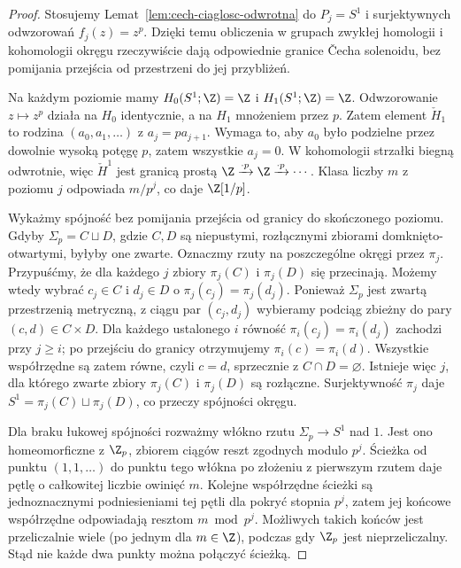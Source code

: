 \begin{proof}
Stosujemy Lemat~\ref{lem:cech-ciaglosc-odwrotna} do
$P_j=S^1$ i surjektywnych odwzorowań
$f_j(z)=z^p$. Dzięki temu obliczenia
w grupach zwykłej homologii i kohomologii
okręgu rzeczywiście dają odpowiednie granice
\v{C}echa solenoidu, bez pomijania przejścia
od przestrzeni do jej przybliżeń.

Na każdym poziomie mamy $H_0(S^1;\Z)=\Z$ i
$H_1(S^1;\Z)=\Z$. Odwzorowanie $z\mapsto z^p$ działa
na $H_0$ identycznie, a na $H_1$ mnożeniem przez $p$.
Zatem element $\check H_1$ to rodzina
$(a_0,a_1,\ldots)$ z $a_j=pa_{j+1}$.
Wymaga to, aby $a_0$ było podzielne przez dowolnie
wysoką potęgę $p$, zatem wszystkie $a_j=0$.
W kohomologii strzałki biegną odwrotnie, więc
$\check H^1$ jest granicą prostą
$\Z\xrightarrow{\cdot p}\Z\xrightarrow{\cdot p}\cdots$.
Klasa liczby $m$ z poziomu $j$ odpowiada $m/p^j$,
co daje $\Z[1/p]$.

Wykażmy spójność bez pomijania przejścia od granicy do
skończonego poziomu. Gdyby
$\Sigma_p=C\sqcup D$, gdzie $C,D$ są niepustymi,
rozłącznymi zbiorami domknięto-otwartymi, byłyby one zwarte.
Oznaczmy rzuty na poszczególne okręgi przez $\pi_j$.
Przypuśćmy, że dla każdego $j$ zbiory
$\pi_j(C)$ i $\pi_j(D)$ się przecinają.
Możemy wtedy wybrać $c_j\in C$ i $d_j\in D$ o
$\pi_j(c_j)=\pi_j(d_j)$. Ponieważ $\Sigma_p$ jest
zwartą przestrzenią metryczną, z ciągu par
$(c_j,d_j)$ wybieramy podciąg zbieżny do pary
$(c,d)\in C\times D$. Dla każdego ustalonego $i$
równość $\pi_i(c_j)=\pi_i(d_j)$ zachodzi przy
$j\geq i$; po przejściu do granicy otrzymujemy
$\pi_i(c)=\pi_i(d)$. Wszystkie współrzędne są
zatem równe, czyli $c=d$, sprzecznie z
$C\cap D=\varnothing$.
Istnieje więc $j$, dla którego zwarte zbiory
$\pi_j(C)$ i $\pi_j(D)$ są rozłączne.
Surjektywność $\pi_j$ daje
$S^1=\pi_j(C)\sqcup\pi_j(D)$, co przeczy
spójności okręgu.

Dla braku łukowej spójności rozważmy włókno rzutu
$\Sigma_p\to S^1$ nad $1$. Jest ono homeomorficzne z
$\Z_p$, zbiorem ciągów reszt zgodnych modulo $p^j$.
Ścieżka od punktu $(1,1,\ldots)$ do punktu tego włókna
po złożeniu z pierwszym rzutem daje pętlę o całkowitej
liczbie owinięć $m$. Kolejne współrzędne ścieżki są
jednoznacznymi podniesieniami tej pętli dla pokryć stopnia
$p^j$, zatem jej końcowe współrzędne odpowiadają resztom
$m\bmod p^j$. Możliwych takich końców jest przeliczalnie
wiele (po jednym dla $m\in\Z$), podczas gdy $\Z_p$ jest
nieprzeliczalny. Stąd nie każde dwa punkty można połączyć
ścieżką.
\end{proof}

